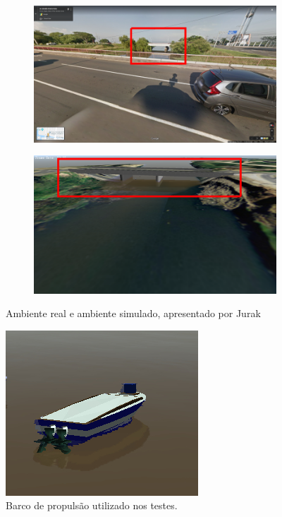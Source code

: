     \begin{figure}[H]
		\centering
        \begin{subfigure}{0.4\textwidth}
            \centering
            \includegraphics[width=\textwidth]{fig/chap5/diluvio_real.png}
            \caption{}
            \label{fig:chap5_diluvio_real}
        \end{subfigure}
        \begin{subfigure}{0.4\textwidth}
            \centering
            \includegraphics[width=\textwidth]{fig/chap5/diluvio_simulado.png}
            \caption{}
            \label{fig:chap5_diluvio_simulado}
        \end{subfigure}
    
    \caption{Ambiente real e ambiente simulado, apresentado por Jurak~\cite{Jurak2020COLREGS}}
    \label{fig:chap5_diluvio}
    \end{figure}
    \begin{figure}[H]
        \centering
        \includegraphics[scale=0.5]{fig/chap5/boat.jpg}
        \caption{Barco de propulsão utilizado nos testes.}
        \label{fig:chap5_boat}
    \end{figure}
    
